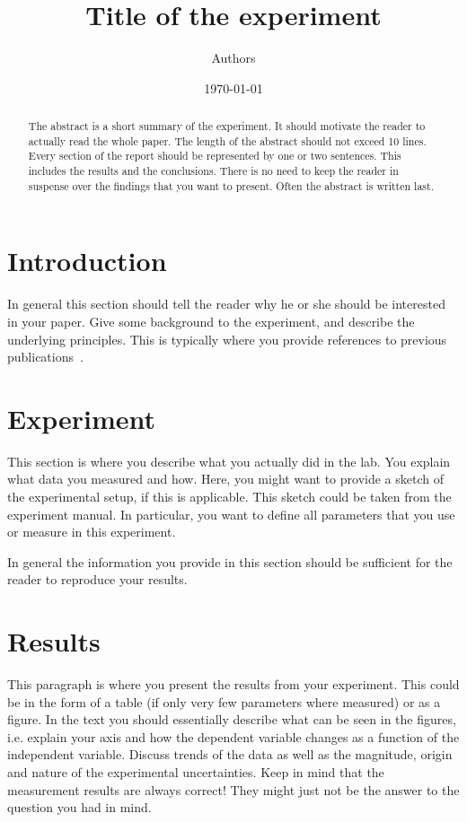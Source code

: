 \documentclass[12pt,a4paper]{article}
\title{Title of the experiment}
\author{Authors}
\date{\today }
\begin{document}
\maketitle

\begin{abstract}
The abstract is a short summary of the experiment. It should
motivate the reader to actually read the whole paper. The length of
the abstract should not exceed 10 lines. Every section of the report
should be represented by one or two sentences. This includes the
results and the conclusions. There is no need to keep the reader in
suspense over the findings that you want to present. Often the
abstract is written last.
\end{abstract}


\tableofcontents

\section{Introduction}

In general this section should tell the reader why he or she should
be interested in your paper. Give some background to the
experiment, and describe the underlying principles. This is typically where you provide references to previous publications~\cite{Sato2003,Cross2004}.

\section{Experiment}

This section is where you describe what you actually did in the lab.
You explain what data you measured and how. Here, you might want to
provide a sketch of the experimental setup, if this is applicable.
This sketch could be taken from the experiment manual. In particular,
you want to define all parameters that you use or measure in this
experiment.

In general the information you provide in this section should be
sufficient for the reader to reproduce your results.

\section{Results}

This paragraph is where you present the results from your
experiment. This could be in the form of a table (if only very few
parameters where measured) or as a figure. In the text you should
essentially describe what can be seen in the figures, i.e. explain
your axis and how the dependent variable changes as a function of
the independent variable. Discuss trends of the data as well as the
magnitude, origin and nature of the experimental uncertainties. Keep
in mind that the measurement results are always correct! They might
just not be the answer to the question you had in mind.
\end{document}
